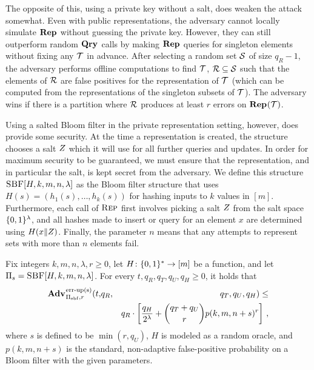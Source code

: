 The opposite of this, using a private key without a salt, does weaken the attack
somewhat. Even with public representations, the adversary cannot locally
simulate $\mathbf{Rep}\hspace{0.5pt}$ without guessing the private key. However, they can still
outperform random $\mathbf{Qry}\hspace{0.5pt}$ calls by making $\mathbf{Rep}\hspace{0.5pt}$ queries for singleton elements
without fixing any $\mathcal{T}$ in advance. After selecting a random set $\mathcal{S}$ of
size $q_R-1$, the adversary performs offline computations to find $\mathcal{T}$,
$\mathcal{R} \subseteq \mathcal{S}$ such that the elements of $\mathcal{R}$ are false positives for
the representation of $\mathcal{T}$ (which can be computed from the representations of
the singleton subsets of $\mathcal{T}$). The adversary wins if there is a partition
where $\mathcal{R}$ produces at least $r$ errors on $\mathbf{Rep}\hspace{0.5pt}(\mathcal{T})$.


Using a salted Bloom filter in the private representation setting, however, does
provide some security. At the time a representation is created, the structure
chooses a salt $Z$ which it will use for all further queries and updates. In
order for maximum security to be guaranteed, we must ensure that the
representation, and in particular the salt, is kept secret from the adversary.
We define this structure $\textsc{SBF}[H,k,m,n,\lambda]$ as the Bloom filter structure
that uses $H(s) = (h_1(s),\ldots,h_k(s))$ for hashing inputs to $k$ values in
$[m]$. Furthermore, each call of $\textsc{Rep}$ first involves picking a salt $Z$
from the salt space $\{0,1\}^\lambda$, and all hashes made to insert or query for
an element $x$ are determined using $H(x \Vert Z)$. Finally, the parameter
$n$ means that any attempts to represent sets with more than $n$ elements fail.

\begin{theorem}\label{thm:bf-priv-salt-bound}
Fix integers $k, m, n, \lambda, r\geq 0$, let $H \colon \{0,1\}^* \to [m]$ be a function, and let $\mathrm{\Pi}_s = \textsc{SBF}[H,k,m,n,\lambda]$.
  For every $t, q_R, q_T, q_U, q_H \geq 0$, it holds that
  \begin{eqnarray*}
    \Adv{\erreps}_{\struct_\saltybloom,r}(t,&q_R,& q_T, q_U, q_H) \leq \\ && q_R \cdot
     \left[
      \frac{q_H}{2^\lambda} +
      {\dbinom{q_T+q_U}{r}} p(k, m, n+s)^r
    \right] \,,
\end{eqnarray*}
where $s$ is defined to be $\min(r,q_U)$, $H$ is modeled as a random oracle, and $p(k, m, n+s)$ is the standard, non-adaptive false-positive probability on a Bloom filter with the given parameters.
\end{theorem}


